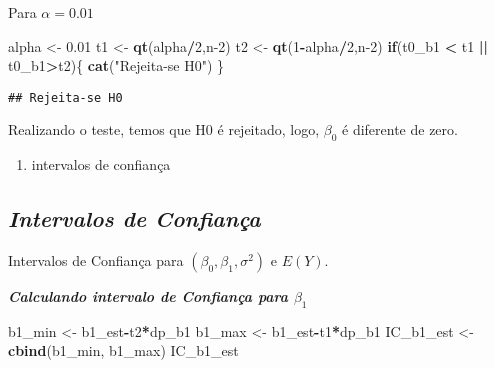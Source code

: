 \documentclass[
]{article}
\newenvironment{Shaded}{\begin{snugshade}}{\end{snugshade}}
\newcommand{\ControlFlowTok}[1]{\textcolor[rgb]{0.13,0.29,0.53}{\textbf{#1}}}
\newcommand{\DecValTok}[1]{\textcolor[rgb]{0.00,0.00,0.81}{#1}}
\newcommand{\FloatTok}[1]{\textcolor[rgb]{0.00,0.00,0.81}{#1}}
\newcommand{\KeywordTok}[1]{\textcolor[rgb]{0.13,0.29,0.53}{\textbf{#1}}}
\newcommand{\NormalTok}[1]{#1}
\newcommand{\OperatorTok}[1]{\textcolor[rgb]{0.81,0.36,0.00}{\textbf{#1}}}
\newcommand{\StringTok}[1]{\textcolor[rgb]{0.31,0.60,0.02}{#1}}
\providecommand{\tightlist}{%
  \setlength{\itemsep}{0pt}\setlength{\parskip}{0pt}}
\begin{document}
Para \(\alpha= 0.01\)

\begin{Shaded}
\begin{Highlighting}[]
\NormalTok{alpha <-}\StringTok{ }\FloatTok{0.01}
\NormalTok{t1 <-}\StringTok{ }\KeywordTok{qt}\NormalTok{(alpha}\OperatorTok{/}\DecValTok{2}\NormalTok{,n}\DecValTok{-2}\NormalTok{)}
\NormalTok{t2 <-}\StringTok{ }\KeywordTok{qt}\NormalTok{(}\DecValTok{1}\OperatorTok{-}\NormalTok{alpha}\OperatorTok{/}\DecValTok{2}\NormalTok{,n}\DecValTok{-2}\NormalTok{)}
\ControlFlowTok{if}\NormalTok{(t0_b1 }\OperatorTok{<}\StringTok{ }\NormalTok{t1 }\OperatorTok{||}\StringTok{ }\NormalTok{t0_b1}\OperatorTok{>}\NormalTok{t2)\{}
  \KeywordTok{cat}\NormalTok{(}\StringTok{"Rejeita-se H0"}\NormalTok{)}
\NormalTok{\}}
\end{Highlighting}
\end{Shaded}

\begin{verbatim}
## Rejeita-se H0
\end{verbatim}

Realizando o teste, temos que H0 é rejeitado, logo, \(\beta_0\) é
diferente de zero.

\begin{enumerate}
\def\labelenumi{\arabic{enumi}.}
\setcounter{enumi}{4}
\tightlist
\item
  intervalos de confiança
\end{enumerate}

\hypertarget{intervalos-de-confianuxe7a}{%
\subsection{\texorpdfstring{\textbf{\emph{Intervalos de
Confiança}}}{Intervalos de Confiança}}\label{intervalos-de-confianuxe7a}}

Intervalos de Confiança para \((\beta_0,\beta_1,\sigma^2)\) e \(E(Y)\).

\textbf{\emph{Calculando intervalo de Confiança para \(\beta_1\)}}

\begin{Shaded}
\begin{Highlighting}[]
\NormalTok{b1_min <-}\StringTok{ }\NormalTok{b1_est}\OperatorTok{-}\NormalTok{t2}\OperatorTok{*}\NormalTok{dp_b1}
\NormalTok{b1_max <-}\StringTok{ }\NormalTok{b1_est}\OperatorTok{-}\NormalTok{t1}\OperatorTok{*}\NormalTok{dp_b1}
\NormalTok{IC_b1_est <-}\StringTok{ }\KeywordTok{cbind}\NormalTok{(b1_min, b1_max)}
\NormalTok{IC_b1_est}
\end{Highlighting}
\end{Shaded}
\end{document}
